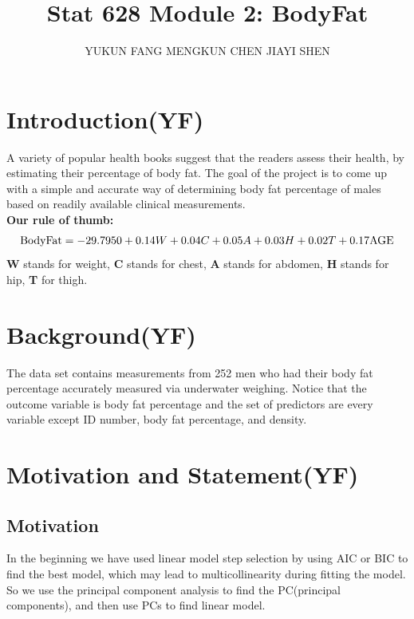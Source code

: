 \documentclass[12pt]{article}
\title{\vspace{-4em}Stat 628 Module 2: BodyFat}
\author{YUKUN FANG \quad MENGKUN CHEN \quad JIAYI SHEN}
\date{}
\begin{document}
\sffamily

\maketitle
\vspace{-2em}
\section{\sffamily Introduction(YF)}
A variety of popular health books suggest that the readers assess their 
health, by estimating their percentage of body fat.
The goal of the project is to come up with 
a simple and accurate way of determining body fat percentage of males
based on readily available clinical measurements.\\
\textbf{Our rule of thumb:} $$ {\rm BodyFat} = -29.7950 + 0.14W + 0.04C + 0.05A+ 0.03H +0.02T + 0.17{\rm AGE}$$
\textbf{W} stands for weight, \textbf{C} stands for chest, \textbf{A} stands for abdomen, \textbf{H} stands for hip, \textbf{T} for thigh.

\vspace{-0.7em}
\section{\sffamily Background(YF)}
The data set contains measurements from 252 men who had their body fat 
percentage accurately measured via underwater weighing. Notice that the 
outcome variable is body fat percentage and the set of predictors are 
every variable except ID number, body fat percentage, and density.
\vspace{-0.7em}
\section{\sffamily Motivation and Statement(YF)}\vspace{-0.3em}
\subsection{\sffamily Motivation}
In the beginning we have used linear model step selection by using 
AIC or BIC to find the best model, which may lead to multicollinearity during fitting the model.
So we use the principal component analysis to find the PC(principal components), and
then use PCs to find linear model.

\vspace{-1em}
\end{document}
